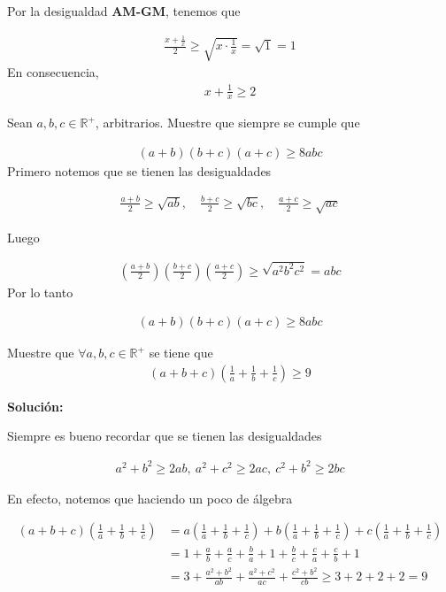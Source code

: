 \documentclass[12pt]{book}
\begin{document}
Por la desigualdad \textbf{AM-GM}, tenemos que 

\begin{align*}
    \frac{x+\frac{1}{x}}{2}\geq \sqrt{x \cdot \frac{1}{x}}=\sqrt{1}=1
\end{align*}
En consecuencia,
\begin{align*}
    x+\frac{1}{x}\geq 2
\end{align*}

\begin{prob}
    Sean $a,b,c \in \mathbb{R}^+$, arbitrarios. Muestre que siempre se cumple que 
\end{prob}
\begin{align*}
    (a+b)(b+c)(a+c)\geq8abc
\end{align*}
Primero notemos que se tienen las desigualdades

\begin{align*}
    \frac{a+b}{2}\geq\sqrt{ab}, \quad \frac{b+c}{2}\geq \sqrt{bc}, \quad \frac{a+c}{2}\geq\sqrt{ac}
\end{align*}

Luego

\begin{align*}
    \left(\frac{a+b}{2}\right) \left(\frac{b+c}{2}\right) \left(\frac{a+c}{2}\right)\geq \sqrt{a^2 b^2 c^2}=abc
\end{align*}
Por lo tanto

\begin{align*}
      (a+b)(b+c)(a+c)\geq8abc
\end{align*}

\begin{prob}{}{}
    Muestre que $\forall a,b,c \in \mathbb{R}^+$ se tiene que 
    \begin{align*}
        (a+b+c)\left(\frac{1}{a}+\frac{1}{b}+\frac{1}{c}\right) \geq 9
    \end{align*}
\end{prob}

\textbf{Solución:}

Siempre es bueno recordar que se tienen las desigualdades

\begin{align*}
    a^2+b^2\geq2 ab, \ a^2+c^2\geq 2ac, \ c^2+b^2 \geq 2 bc
\end{align*}

En efecto, notemos que haciendo un poco de álgebra

\begin{align*}
    (a+b+c)\left(\frac{1}{a}+\frac{1}{b}+\frac{1}{c}\right)
    &=a \left(\frac{1}{a}+\frac{1}{b}+\frac{1}{c}\right)+b\left(\frac{1}{a}+\frac{1}{b}+\frac{1}{c}\right)+c\left(\frac{1}{a}+\frac{1}{b}+\frac{1}{c}\right) \\
    &=1+ \frac{a}{b}+\frac{a}{c}+\frac{b}{a}+1+\frac{b}{c}+\frac{c}{a}+\frac{c}{b}+1 \\
    &=3+\frac{a^2+b^2}{ab}+\frac{a^2+c^2}{ac}+\frac{c^2+b^2}{cb}\geq 3+2+2+2=9    
\end{align*}
\end{document}
